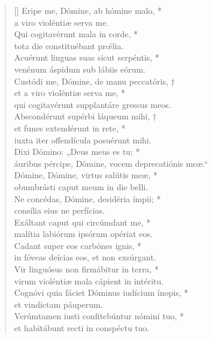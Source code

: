\begin{verse}[\versewidth]
Eripe me, Dómine, ab hómine malo, *\\
a viro violéntiæ serva me.\\
\vin Qui cogitavérunt mala in corde, *\\
\vin tota die constituébant pr\'{\oe}lia.\\
Acuérunt linguas suas sicut serpéntis, *\\
venénum áspidum sub lábiis eórum.\\
\vin Custódi me, Dómine, de manu peccatóris, †\\
\vin et a viro violéntiæ serva me, *\\
\vin qui cogitavérunt supplantáre gressus meos.\\
Abscondérunt supérbi láqueum mihi, †\\
et funes extendérunt in rete, *\\
iuxta iter offendícula posuérunt mihi.\\
\vin Dixi Dómino: „Deus meus es tu; *\\
\vin áuribus pércipe, Dómine, vocem deprecatiónis meæ.“\\
Dómine, Dómine, virtus salútis meæ, *\\
obumbrásti caput meum in die belli.\\
\vin Ne concédas, Dómine, desidéria ímpii; *\\
\vin consília eius ne perfícias.\\
Exáltant caput qui circúmdant me, *\\
malítia labiórum ipsórum opériat eos.\\
\vin Cadant super eos carbónes ignis, *\\
\vin in fóveas deícias eos, et non exsúrgant.\\
Vir linguósus non firmábitur in terra, *\\
virum violéntiæ mala cápient in intéritu.\\
\vin Cognóvi quia fáciet Dóminus iudícium ínopis, *\\
\vin et vindíctam páuperum.\\
Verúmtamen iusti confitebúntur nómini tuo, *\\
et habitábunt recti in conspéctu tuo.\\
\end{verse}
\vspace{1cm}



